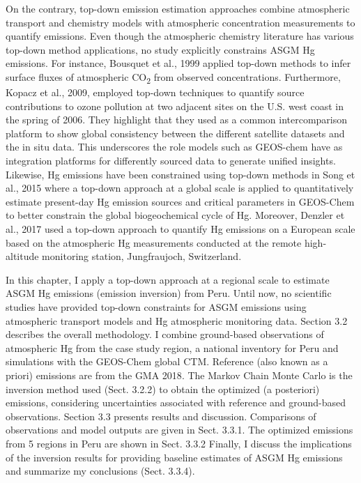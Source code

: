 \begin{flushleft}
On the contrary, top-down emission estimation approaches combine atmospheric transport and chemistry models with atmospheric concentration measurements to quantify emissions. Even though the atmospheric chemistry literature has various top-down method applications, no study explicitly constrains ASGM Hg emissions. For instance, Bousquet et al., 1999 applied top-down methods to infer surface fluxes of atmospheric CO\textsubscript{2} from observed concentrations\cite{bousquet_inverse_1999}. Furthermore, Kopacz et al., 2009, employed top-down techniques to quantify source contributions to ozone pollution at two adjacent sites on the U.S. west coast in the spring of 2006. They highlight that they used  \gc as a common intercomparison platform to show global consistency between the different satellite datasets and the in situ data. This underscores the role models such as GEOS-chem have as integration platforms for differently sourced data to generate unified insights. Likewise, Hg emissions have been constrained using top-down methods in Song et al., 2015 where a top-down approach at a global scale is applied to quantitatively estimate present-day Hg emission sources and critical parameters in GEOS-Chem to better constrain the global biogeochemical cycle of Hg. Moreover, Denzler et al., 2017 used a top-down approach to quantify Hg emissions on a European scale based on the atmospheric Hg measurements conducted at the remote high-altitude monitoring station, Jungfraujoch, Switzerland. 
\end{flushleft}
\begin{flushleft}
In this chapter, I apply a top-down approach at a regional scale to estimate ASGM Hg emissions (emission inversion) from Peru. Until now, no scientific studies have provided top-down constraints for ASGM emissions using atmospheric transport models and Hg atmospheric monitoring data. Section 3.2 describes the overall methodology. I combine ground-based observations of atmospheric Hg from the case study region\cite{koenig_seasonal_2021}, a national inventory for Peru\cite{artisanal_gold_council_reporte_2017} and simulations with the GEOS-Chem global CTM. Reference (also known as a priori) emissions are from the GMA 2018\cite{steenhuisen_development_2019,united_nations_environment_programme_technical_2019}. The Markov Chain Monte Carlo is the inversion method used (Sect. 3.2.2) to obtain the optimized (a posteriori) emissions, considering uncertainties associated with reference and ground-based observations. Section 3.3 presents results and discussion. Comparisons of observations and model outputs are given in Sect. 3.3.1. The optimized emissions from 5 regions in Peru are shown in Sect. 3.3.2 Finally, I discuss the implications of the inversion results for providing baseline estimates of ASGM Hg emissions  and summarize my conclusions (Sect. 3.3.4).

\end{flushleft}
\newpage
